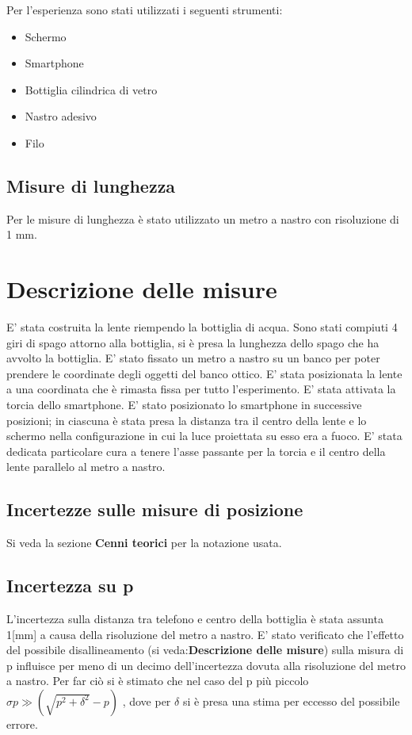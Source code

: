 \documentclass{article}
\begin{document}
Per l'esperienza sono stati utilizzati i seguenti strumenti:
\begin{itemize}

\item Schermo
\item Smartphone
\item Bottiglia cilindrica di vetro
\item Nastro adesivo
\item Filo
\end{itemize}


\subsection{Misure di lunghezza}
Per le misure di lunghezza è stato utilizzato un metro a nastro con risoluzione di 1 mm.



\section{Descrizione delle misure}

E' stata costruita la lente riempendo la bottiglia di acqua.
Sono stati compiuti 4 giri di spago attorno alla bottiglia, si è presa la lunghezza dello spago che ha avvolto la bottiglia.
E' stato fissato un metro  a nastro su un banco per poter prendere le coordinate degli oggetti del banco ottico.
E' stata posizionata la lente a una coordinata che è rimasta fissa per tutto l'esperimento.
E' stata attivata la torcia dello smartphone.
E' stato posizionato lo smartphone in successive posizioni; in ciascuna è  stata presa la distanza tra il centro della lente e lo schermo nella configurazione in cui la luce proiettata su esso era a fuoco.
E' stata dedicata particolare cura a tenere l'asse passante per la torcia e il centro della lente  parallelo al metro a nastro.

\subsection{Incertezze sulle misure di posizione}

Si veda la sezione \textbf{Cenni teorici} per la notazione usata.

\subsection{Incertezza su p}

L'incertezza sulla distanza tra telefono e centro della bottiglia è stata assunta 1[mm] a causa della risoluzione del metro a nastro.
E' stato verificato che l'effetto del possibile disallineamento (si veda:\textbf{Descrizione delle misure}) sulla misura di p influisce per meno di un decimo dell'incertezza dovuta alla risoluzione del metro a nastro. Per far ciò si è stimato che nel caso del p più piccolo $\sigma p \gg (\sqrt{p^2+\delta^2}-p)$ , dove per $\delta$ si è presa una stima per eccesso del possibile errore.
\end{document}
